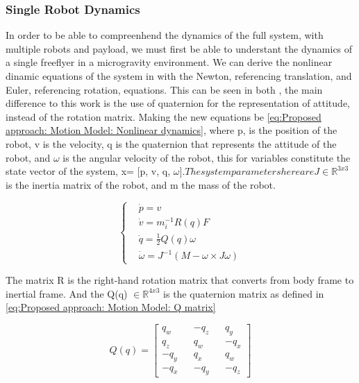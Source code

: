 \subsubsection{Single Robot Dynamics}
In order to be able to compreenhend the dynamics of the full system, with multiple robots and payload, we must first be able to understant the dynamics of a single freeflyer in a microgravity environment. We can derive the nonlinear dinamic equations of the system in with the Newton, referencing translation, and Euler, referencing rotation, equations. This can be seen in both \cite{RoqueVentura2016spacecobot}, the main difference to this work is the use of quaternion for the representation of attitude, instead of the rotation matrix. Making the new equations be \ref{eq:Proposed approach: Motion Model: Nonlinear dynamics}, where p, is the position of the robot, v is the velocity, q is the quaternion that represents the attitude of the robot, and $\omega$ is the angular velocity of the robot, this for variables constitute the state vector of the system, x= [p, v, q, $\omega]. The system parameters here are J \in \mathbb{R}^{3x3}$ is the inertia matrix of the robot, and m the mass of the robot.

\begin{equation}
    \begin{cases}
        &\dot{p} = v \\
        &\dot{v} =m_i^{-1} R(q)F \\
        &\dot{q} = \frac{1}{2}Q(q) \omega \\ 
        &\dot{\omega} = J^{-1} \left(M -\omega \times J\omega \right) 
    \end{cases}
    \label{eq:Proposed approach: Motion Model: Nonlinear dynamics}
\end{equation}

The matrix R is the right-hand rotation matrix that converts from body frame to inertial frame. And the Q(q) $\in \mathbb{R}^{4x3}$ is the quaternion matrix as defined in \ref{eq:Proposed approach: Motion Model: Q matrix}

\begin{equation}
    Q\left(q\right) = 
    \begin{bmatrix}
        q_w && -q_z && q_y \\
        q_z && q_w && -q_x \\
        -q_y && q_x && q_w \\
        -q_x && -q_y && -q_z
    \end{bmatrix}
    \label{eq:Proposed approach: Motion Model: Q matrix}
\end{equation}

